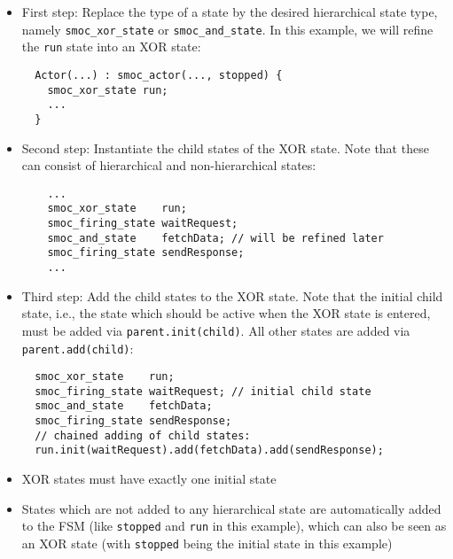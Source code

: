 \begin{frame}[fragile=singleslide]
\begin{itemize}
\item First step: Replace the type of a state by the desired hierarchical state type, namely \texttt{smoc\_xor\_state} or \texttt{smoc\_and\_state}.  In this example, we will refine the \texttt{run} state into an XOR state:
\begin{lstlisting}
  Actor(...) : smoc_actor(..., stopped) {
    smoc_xor_state run;
    ...
  }
\end{lstlisting}
\item Second step: Instantiate the child states of the XOR state. Note that these can consist of hierarchical and non-hierarchical states:
\begin{lstlisting}
    ...    
    smoc_xor_state    run;
    smoc_firing_state waitRequest;
    smoc_and_state    fetchData; // will be refined later
    smoc_firing_state sendResponse;
    ...
\end{lstlisting}
\end{itemize}
\end{frame}

\begin{frame}[fragile=singleslide]
\begin{itemize}
\item Third step: Add the child states to the XOR state. Note that the initial child state, i.e., the state which should be active when the XOR state is entered, must be added via \texttt{parent.init(child)}. All other states are added via \texttt{parent.add(child)}:
\begin{lstlisting}
  smoc_xor_state    run;
  smoc_firing_state waitRequest; // initial child state
  smoc_and_state    fetchData;
  smoc_firing_state sendResponse;
  // chained adding of child states:
  run.init(waitRequest).add(fetchData).add(sendResponse);
\end{lstlisting}
\item XOR states must have exactly one initial state
\item States which are not added to any hierarchical state are automatically added to the FSM (like \texttt{stopped} and \texttt{run} in this example), which can also be seen as an XOR state (with \texttt{stopped} being the initial state in this example)
\end{itemize}
\end{frame}

